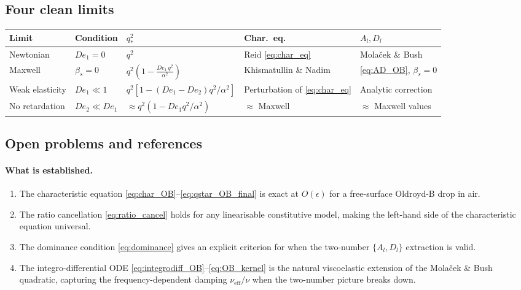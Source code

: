 \subsection{Four clean limits}

\begin{center}
\begin{tabular}{lllll}
  \toprule
  Limit & Condition & $q_*^2$ & Char.\ eq.\ & $A_l,D_l$ \\
  \midrule
  Newtonian
    & $De_1 = 0$
    & $q^2$
    & Reid \eqref{eq:char_eq}
    & Mola\v{c}ek \& Bush \\[4pt]
  Maxwell
    & $\beta_s = 0$
    & $q^2\!\left(1 - \tfrac{De_1\,q^2}{\alpha^2}\right)$
    & Khismatullin \& Nadim
    & \eqref{eq:AD_OB}, $\beta_s=0$ \\[4pt]
  Weak elasticity
    & $De_1\ll 1$
    & $q^2[1-(De_1\!-\!De_2)q^2/\alpha^2]$
    & Perturbation of \eqref{eq:char_eq}
    & Analytic correction \\[4pt]
  No retardation
    & $De_2\ll De_1$
    & $\approx q^2(1-De_1 q^2/\alpha^2)$
    & $\approx$ Maxwell
    & $\approx$ Maxwell values \\
  \bottomrule
\end{tabular}
\end{center}

\subsection{Open problems and references}
\label{sec:OB_open}

\paragraph{What is established.}
\begin{enumerate}
  \item The characteristic equation \eqref{eq:char_OB}--\eqref{eq:qstar_OB_final}
        is exact at $O(\epsilon)$ for a free-surface Oldroyd-B drop in air.
  \item The ratio cancellation \eqref{eq:ratio_cancel} holds for any
        linearisable constitutive model, making the left-hand side of the
        characteristic equation universal.
  \item The dominance condition \eqref{eq:dominance} gives an explicit
        criterion for when the two-number $\{A_l,D_l\}$ extraction is valid.
  \item The integro-differential ODE \eqref{eq:integrodiff_OB}--\eqref{eq:OB_kernel}
        is the natural viscoelastic extension of the Mola\v{c}ek \& Bush quadratic,
        capturing the frequency-dependent damping $\nu_{\mathrm{eff}}/\nu$ when
        the two-number picture breaks down.
\end{enumerate}

